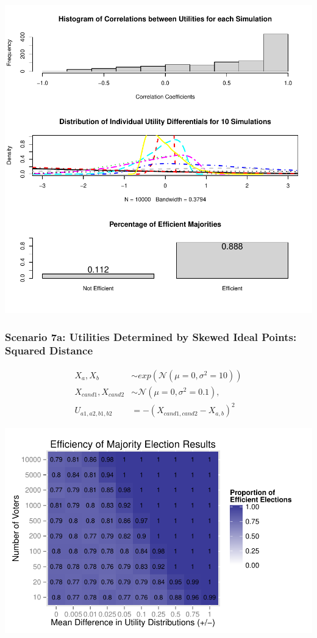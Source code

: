 \documentclass[12pt]{article}\usepackage[]{graphicx}\usepackage[]{color}
\makeatletter
\def\maxwidth{ %
  \ifdim\Gin@nat@width>\linewidth
    \linewidth
  \else
    \Gin@nat@width
  \fi
}
\newenvironment{knitrout}{}{} %
\makeatother
\begin{document}
\begin{knitrout}
\color{fgcolor}
\includegraphics[width=\maxwidth]{figure/unnamed-chunk-12} 

\end{knitrout}


\clearpage
\subsubsection*{Scenario 7a: Utilities Determined by Skewed Ideal Points: Squared Distance}
\begin{align*}
X_a,X_b &\sim exp(\mathcal{N}(\mu=0,\sigma^2=10)) \\
X_{cand1},X_{cand2} &\sim \mathcal{N}(\mu=0,\sigma^2=0.1), \\
U_{a1,a2,b1,b2} &= -(X_{cand1,cand2}-X_{a,b})^2
\end{align*}

\begin{knitrout}
\color{fgcolor}
\includegraphics[width=\maxwidth]{figure/unnamed-chunk-13} 

\end{knitrout}
\end{document}
